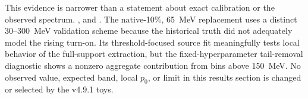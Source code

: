 This evidence is narrower than a statement about exact calibration or the
observed spectrum.  \VFourPNineOneWidthState, and
\VFourPNineOneResponseState.  The native-10\%, 65~MeV replacement uses a distinct
30--300~MeV validation scheme because the historical truth did not adequately model
the rising turn-on.  Its threshold-focused source fit meaningfully tests local
behavior of the full-support extraction, but the fixed-hyperparameter tail-removal
diagnostic shows a nonzero aggregate contribution from bins above 150~MeV.  No
observed value, expected band, local $p_0$, or limit in this results section is changed
or selected by the v4.9.1 toys.
